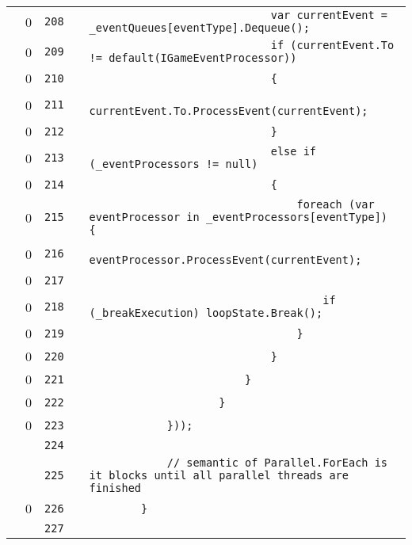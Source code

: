 \documentclass[a4paper,landscape,10pt]{article}
\begin{document}
\begin{longtable}[l]{lrrll}
\cellcolor{red} & 0 & \verb~208~ & & \verb~                            var currentEvent = _eventQueues[eventType].Dequeue();~\\
\cellcolor{red} & 0 & \verb~209~ & & \verb~                            if (currentEvent.To != default(IGameEventProcessor))~\\
\cellcolor{red} & 0 & \verb~210~ & & \verb~                            {~\\
\cellcolor{red} & 0 & \verb~211~ & & \verb~                                currentEvent.To.ProcessEvent(currentEvent);~\\
\cellcolor{red} & 0 & \verb~212~ & & \verb~                            }~\\
\cellcolor{red} & 0 & \verb~213~ & & \verb~                            else if (_eventProcessors != null)~\\
\cellcolor{red} & 0 & \verb~214~ & & \verb~                            {~\\
\cellcolor{red} & 0 & \verb~215~ & & \verb~                                foreach (var eventProcessor in _eventProcessors[eventType]) {~\\
\cellcolor{red} & 0 & \verb~216~ & & \verb~                                    eventProcessor.ProcessEvent(currentEvent);~\\
\cellcolor{red} & 0 & \verb~217~ & & \verb~~\\
\cellcolor{red} & 0 & \verb~218~ & & \verb~                                    if (_breakExecution) loopState.Break();~\\
\cellcolor{red} & 0 & \verb~219~ & & \verb~                                }~\\
\cellcolor{red} & 0 & \verb~220~ & & \verb~                            }~\\
\cellcolor{red} & 0 & \verb~221~ & & \verb~                        }~\\
\cellcolor{red} & 0 & \verb~222~ & & \verb~                    }~\\
\cellcolor{red} & 0 & \verb~223~ & & \verb~            }));~\\
\cellcolor{gray} &  & \verb~224~ & & \verb~~\\
\cellcolor{gray} &  & \verb~225~ & & \verb~            // semantic of Parallel.ForEach is it blocks until all parallel threads are finished~\\
\cellcolor{red} & 0 & \verb~226~ & & \verb~        }~\\
\cellcolor{gray} &  & \verb~227~ & & \verb~~\\

\end{longtable}
\end{document}
